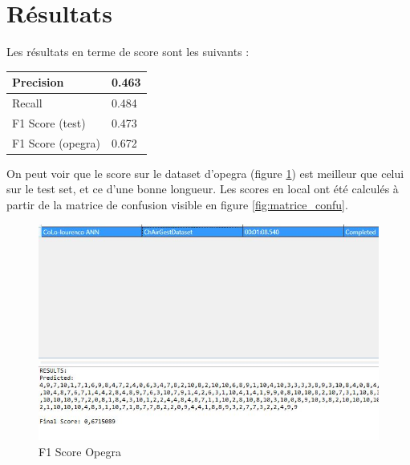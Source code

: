 \section*{Résultats}

Les résultats en terme de score sont les suivants :

\begin{center}
\begin{tabularx}{\textwidth}{|X|X|}
\hline 
Precision & 0.463 \\ 
\hline 
Recall & 0.484 \\ 
\hline 
F1 Score (test) & 0.473 \\ 
\hline 
F1 Score (opegra) & 0.672 \\ 
\hline 
\end{tabularx} 
\end{center}

On peut voir que le score sur le dataset d'opegra (figure \ref{fig:opegra}) est meilleur que celui sur le test set, et ce d'une bonne longueur. Les scores en local ont été calculés à partir de la matrice de confusion visible en figure \ref{fig:matrice_confu}. \\

\begin{figure}[h]
  \centering
    \includegraphics[width=0.8\linewidth]{img/ann/results/opegra.jpg}
  \caption{F1 Score Opegra}
  \label{fig:opegra}
\end{figure}

